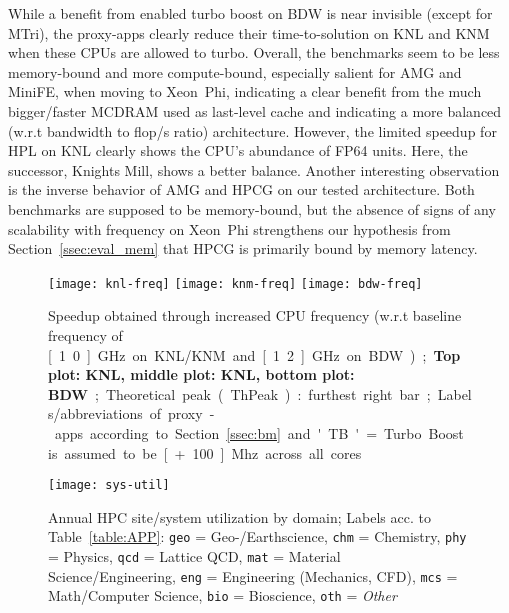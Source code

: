 While a benefit from enabled turbo boost on BDW is near invisible (except for MTri), the proxy-apps clearly reduce their
time-to-solution on KNL and KNM when these CPUs are allowed to turbo. Overall, the benchmarks seem to be less memory-bound
and more compute-bound, especially salient for AMG and MiniFE,  when moving to Xeon~Phi, indicating a clear benefit
from the much bigger/faster MCDRAM used as last-level cache and indicating a more balanced
(w.r.t bandwidth to \unit[]{flop/s} ratio) architecture.
However, the limited speedup for HPL on KNL clearly shows the CPU's abundance of FP64 units.
Here, the successor, Knights Mill, shows a better balance.
Another interesting observation is the inverse behavior of AMG and HPCG on our tested architecture.
Both benchmarks are supposed to be memory-bound, but the absence of signs of any scalability with frequency on Xeon~Phi
strengthens our hypothesis from Section~\ref{ssec:eval_mem} that HPCG is primarily bound by memory latency.
%
\begin{figure}[tbp]
    \centering
    \texttt{[image: knl-freq]}
    \texttt{[image: knm-freq]}
    \texttt{[image: bdw-freq]}
    \vspace*{-5mm}
    \caption{\label{fig:freq} Speedup obtained through increased CPU frequency (w.r.t baseline frequency of \unit[1.0]{GHz} on KNL/KNM and \unit[1.2]{GHz} on BDW); \textbf{Top plot: KNL, middle plot: KNL, bottom plot: BDW}; Theoretical peak (ThPeak): furthest right bar; Labels/abbreviations of proxy-apps according to Section~\ref{ssec:bm} and 'TB' = Turbo Boost is assumed to be \unit[+100]{Mhz} across all cores}
    \vspace{-0.2em}
\end{figure}
%
\begin{figure}[tbp]
    \centering
    \texttt{[image: sys-util]}
    \vspace*{-7mm}
    \caption{\label{fid:disc:breakdown} Annual HPC site/system utilization by domain; Labels acc. to Table~\ref{table:APP}: \texttt{geo} = Geo-/Earthscience, \texttt{chm} = Chemistry, \texttt{phy} = Physics, \texttt{qcd} = Lattice QCD, \texttt{mat} = Material Science/Engineering, \texttt{eng} = Engineering (Mechanics, CFD), \texttt{mcs} = Math/Computer Science, \texttt{bio} = Bioscience, \texttt{oth} = \textit{Other}}
    \vspace{-1em}
\end{figure}
%

